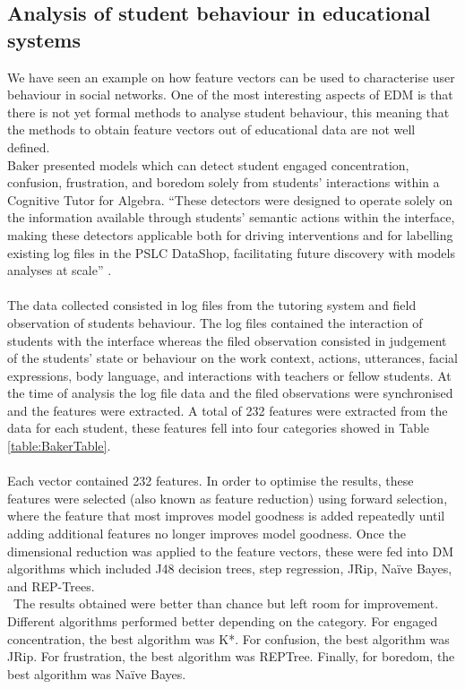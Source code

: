 \documentclass[11pt, oneside]{article}   	%
\begin{document}
\subsection{Analysis of student behaviour in educational systems}
We have seen an example on how feature vectors can be used to characterise user behaviour in social networks. One of the most interesting aspects of EDM is that there is not yet formal methods to analyse student behaviour, this meaning that the methods to obtain feature vectors out of educational data are not well defined.\\
Baker \cite{Baker2012} presented models which can detect student engaged concentration, confusion, frustration, and boredom solely from students' interactions within a Cognitive Tutor for Algebra. ``These detectors were designed to operate solely on the information available through students' semantic actions within the interface, making these detectors applicable both for driving interventions and for labelling existing log files in the PSLC DataShop, facilitating future discovery with models analyses at scale'' \cite{Baker2012}.\\\\
The data collected consisted in log files from the tutoring system and field observation of students behaviour. The log files contained the interaction of students with the interface whereas the filed observation consisted in judgement of the students' state or behaviour on the work context, actions, utterances, facial expressions, body language, and interactions with teachers or fellow students. At the time of analysis the log file data and the filed observations were synchronised and the features were extracted. A total of 232 features were extracted from the data for each student, these features fell into four categories showed in Table \ref{table:BakerTable}. 
\\\\Each vector contained 232 features. In order to optimise the results, these features were selected (also known as feature reduction) using forward selection, where the feature that most improves model goodness is added repeatedly until adding additional features no longer improves model goodness. Once the dimensional reduction was applied to the feature vectors, these were fed into DM algorithms which included J48 decision trees, step regression, JRip, Na\"{i}ve Bayes, and REP-Trees.\\\
The results obtained were better than chance but left room for improvement. Different algorithms performed better depending on the category. For engaged concentration, the best algorithm was K*. For confusion, the best algorithm was JRip. For frustration, the best algorithm was REPTree. Finally, for boredom, the best algorithm was Na\"{i}ve Bayes.
\end{document}
